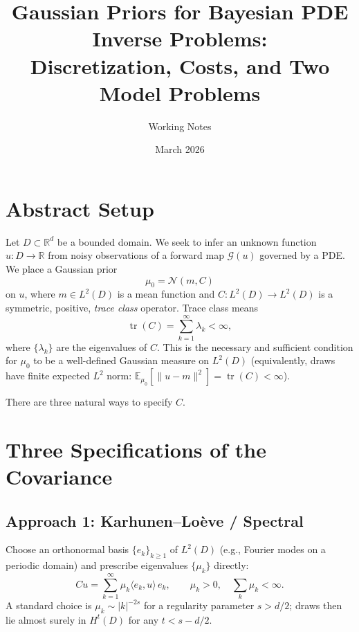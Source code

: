 \documentclass[11pt]{article}
\title{Gaussian Priors for Bayesian PDE Inverse Problems:\\
Discretization, Costs, and Two Model Problems}
\author{Working Notes}
\date{March 2026}
\newcommand{\R}{\mathbb{R}}
\DeclareMathOperator{\tr}{tr}
\begin{document}
\maketitle

\tableofcontents
\bigskip

\section{Abstract Setup}\label{sec:abstract}

Let $D \subset \R^d$ be a bounded domain.  We seek to infer an unknown function $u: D \to \R$ from noisy observations of a forward map $\mathcal{G}(u)$ governed by a PDE.  We place a Gaussian prior
\[
  \mu_0 = \mathcal{N}(m, C)
\]
on $u$, where $m \in L^2(D)$ is a mean function and $C: L^2(D) \to L^2(D)$ is a symmetric, positive, \emph{trace class} operator.  Trace class means
\[
  \tr(C) = \sum_{k=1}^\infty \lambda_k < \infty,
\]
where $\{\lambda_k\}$ are the eigenvalues of $C$.  This is the necessary and sufficient condition for $\mu_0$ to be a well-defined Gaussian measure on $L^2(D)$ (equivalently, draws have finite expected $L^2$ norm: $\mathbb{E}_{\mu_0}[\|u - m\|^2] = \tr(C) < \infty$).

There are three natural ways to specify $C$.


\section{Three Specifications of the Covariance}\label{sec:three}

\subsection{Approach 1: Karhunen--Lo\`eve / Spectral}\label{sec:KL}

Choose an orthonormal basis $\{e_k\}_{k \geq 1}$ of $L^2(D)$ (e.g., Fourier modes on a periodic domain) and prescribe eigenvalues $\{\mu_k\}$ directly:
\[
  Cu = \sum_{k=1}^\infty \mu_k \langle e_k, u\rangle\, e_k,
  \qquad \mu_k > 0,\quad \sum_k \mu_k < \infty.
\]
A standard choice is $\mu_k \sim |k|^{-2s}$ for a regularity parameter $s > d/2$; draws then lie almost surely in $H^t(D)$ for any $t < s - d/2$.
\end{document}
